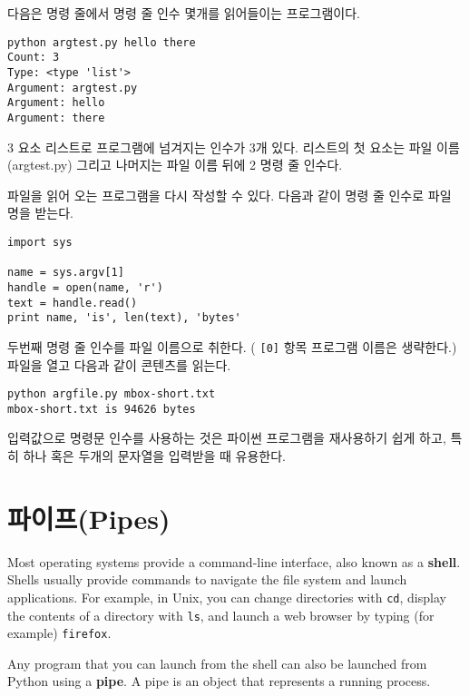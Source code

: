 다음은 명령 줄에서 명령 줄 인수 몇개를 읽어들이는 프로그램이다. 

\beforeverb
\begin{verbatim}
python argtest.py hello there
Count: 3
Type: <type 'list'>
Argument: argtest.py
Argument: hello
Argument: there
\end{verbatim}
\afterverb
%

3 요소 리스트로 프로그램에 넘겨지는 인수가 3개 있다.
리스트의 첫 요소는 파일 이름 (argtest.py) 그리고 나머지는 파일 이름 뒤에 2 명령 줄 인수다.

파일을 읽어 오는 프로그램을 다시 작성할 수 있다. 다음과 같이 명령 줄 인수로 
파일 명을 받는다. 

\beforeverb
\begin{verbatim}
import sys

name = sys.argv[1]
handle = open(name, 'r')
text = handle.read()
print name, 'is', len(text), 'bytes'
\end{verbatim}
\afterverb
%

두번째 명령 줄 인수를 파일 이름으로 취한다. ( {\tt [0]} 항목 프로그램 이름은 생략한다.)
파일을 열고 다음과 같이 콘텐츠를 읽는다.

\beforeverb
\begin{verbatim}
python argfile.py mbox-short.txt
mbox-short.txt is 94626 bytes
\end{verbatim}
\afterverb
%

입력값으로 명령문 인수를 사용하는 것은 파이썬 프로그램을 재사용하기 쉽게 하고,
특히 하나 혹은 두개의 문자열을 입력받을 때 유용한다.

\section{파이프(Pipes)}




Most operating systems provide a command-line interface,
also known as a {\bf shell}.  Shells usually provide commands
to navigate the file system and launch applications.  For
example, in Unix, you can change directories with {\tt cd},
display the contents of a directory with {\tt ls}, and launch
a web browser by typing (for example) {\tt firefox}.


Any program that you can launch from the shell can also be
launched from Python using a {\bf pipe}.  A pipe is an object
that represents a running process.

